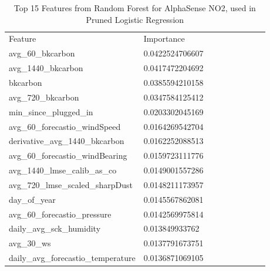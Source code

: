 \begin{table}[H]
\centering
\begin{tabular}{lllllllll}
\\
\\
\toprule
Feature & Importance \\
\midrule
 avg\_60\_bkcarbon & 0.0422524706607 \\
 avg\_1440\_bkcarbon & 0.0417472204692 \\
 bkcarbon & 0.0385594210158 \\
 avg\_720\_bkcarbon & 0.0347584125412 \\
 min\_since\_plugged\_in & 0.0203302045169 \\
 avg\_60\_forecastio\_windSpeed & 0.0164269542704 \\
 derivative\_avg\_1440\_bkcarbon & 0.0162252088513 \\
 avg\_60\_forecastio\_windBearing & 0.0159723111776 \\
 avg\_1440\_lmse\_calib\_as\_co & 0.0149001557286 \\
 avg\_720\_lmse\_scaled\_sharpDust & 0.0148211173957 \\
 day\_of\_year & 0.0145567862081 \\
 avg\_60\_forecastio\_pressure & 0.0142569975814 \\
 daily\_avg\_sck\_humidity & 0.013849933762 \\
 avg\_30\_ws & 0.0137791673751 \\
 daily\_avg\_forecastio\_temperature & 0.0136871069105 \\
\bottomrule
\end{tabular}
\label{tab:as_no2_randomforest_features}
\caption{Top 15 Features from Random Forest for AlphaSense NO2, used in Pruned Logistic Regression}
\end{table}



